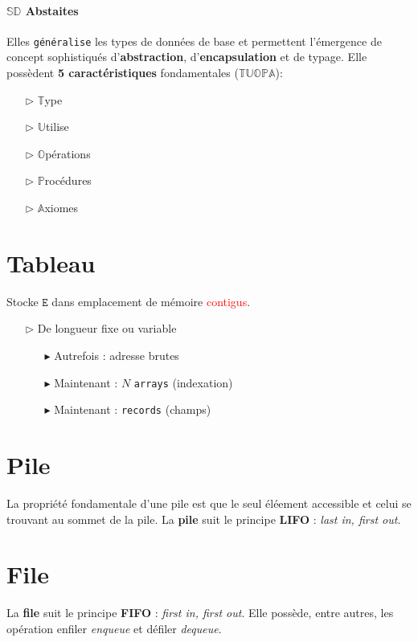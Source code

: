 \documentclass{report}
\begin{document}
\begin{multicols*}{3}
    \paragraph{$\mathbb{SD}$ Abstaites}
    Elles \texttt{généralise} les types de données de base et permettent 
    l'émergence de concept sophistiqués d'\textbf{abstraction}, 
    d'\textbf{encapsulation} et de typage. Elle possèdent 
    \textbf{5 caractéristiques} fondamentales ($\mathbb{TUOPA}$): 
    \begin{itemize}
      \item [$\rhd$ ]  $\mathbb{T}$ype
      \item [$\rhd$ ] $\mathbb{U}$tilise 
      \item [$\rhd$ ] $\mathbb{O}$pérations
      \item [$\rhd$ ] $\mathbb{P}$rocédures
      \item [$\rhd$ ] $\mathbb{A}$xiomes 
    \end{itemize}
    
    \section{Tableau}
    \noindent
    Stocke $\texttt{E}$ dans emplacement de mémoire \textcolor{red}{contigus}.
    \begin{itemize}
      \item [$\rhd$ ] De longueur fixe ou variable
        \begin{itemize}
          \item [$\blacktriangleright$ ] Autrefois : adresse brutes
          \item [$\blacktriangleright$ ] Maintenant : $N$ \texttt{arrays} (indexation)  
          \item [$\blacktriangleright$ ] Maintenant : \texttt{records} (champs)  
        \end{itemize}
    \end{itemize}

    \section{Pile}
    La propriété fondamentale d'une pile est que le seul éléement accessible 
    et celui se trouvant au sommet de la pile. La \textbf{pile}  suit le principe 
    \textbf{LIFO} : \textit{last in, first out}.     



    \section{File}
    La \textbf{file}   suit le principe 
    \textbf{FIFO} : \textit{first in, first out}. Elle possède, entre autres,
    les opération enfiler \textit{enqueue} et défiler \textit{dequeue}.      


\end{multicols*}
\end{document}
